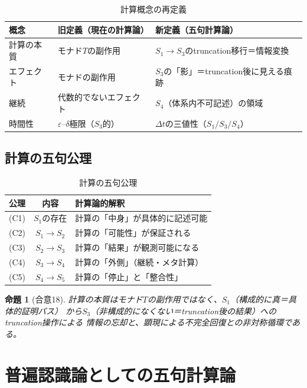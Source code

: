 \documentclass[11pt,a4paper]{ltjsarticle}
\newtheorem{proposition}[definition]{命題}
\theoremstyle{remark}
\newcommand{\dt}{\Delta t}
\begin{document}
\begin{table}[htbp]
\centering
\caption{計算概念の再定義}
\label{tab:computation-redefinition}
\small
\begin{tabularx}{\textwidth}{@{}l >{\raggedright\arraybackslash}X >{\raggedright\arraybackslash}X@{}}
\toprule
概念 & 旧定義（現在の計算論） & 新定義（五句計算論） \\
\midrule
計算の本質 & モナド$T$の副作用 & $S_1\to S_3$のtruncation移行＝情報変換 \\
エフェクト & モナドの副作用 & $S_3$の「影」＝truncation後に見える痕跡 \\
継続 & 代数的でないエフェクト & $S_4$（体系内不可記述）の領域 \\
時間性 & $\varepsilon$--$\delta$極限（$S_3$的） & $\dt$の三値性（$S_1/S_3/S_4$） \\
\bottomrule
\end{tabularx}
\end{table}

\subsection{計算の五句公理}

\begin{table}[htbp]
\centering
\caption{計算の五句公理}
\label{tab:computation-axioms}
\small
\begin{tabularx}{\textwidth}{@{}c c >{\raggedright\arraybackslash}X@{}}
\toprule
公理 & 内容 & 計算論的解釈 \\
\midrule
(C1) & $S_1$の存在 & 計算の「中身」が具体的に記述可能 \\
(C2) & $S_1\to S_2$ & 計算の「可能性」が保証される \\
(C3) & $S_2\to S_3$ & 計算の「結果」が観測可能になる \\
(C4) & $S_3\to S_4$ & 計算の「外側」（継続・メタ計算） \\
(C5) & $S_4\to S_5$ & 計算の「停止」と「整合性」 \\
\bottomrule
\end{tabularx}
\end{table}

\begin{proposition}[合意18]
計算の本質はモナド$T$の副作用ではなく、$S_1$（構成的に真＝具体的証明パス）
から$S_3$（非構成的になくない＝truncation後の結果）へのtruncation操作による
情報の忘却と、顕現による不完全回復との非対称循環である。
\end{proposition}

\section{普遍認識論としての五句計算論}
\label{sec:epistemology}
\end{document}
